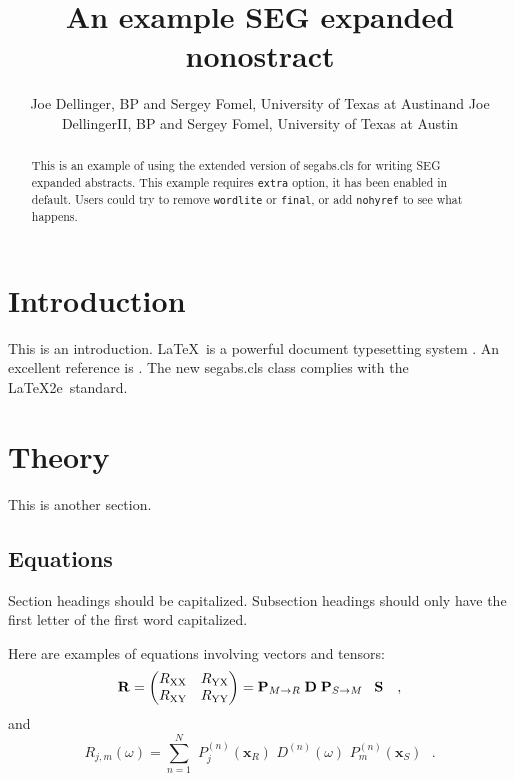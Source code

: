 \documentclass[wordlite,texlive,final]{segabs}
\newcommand{\rs}[1]{\mathstrut\mbox{\scriptsize\rm #1}}
\begin{document}
\title{An example SEG expanded nonostract}

\renewcommand{\thefootnote}{\fnsymbol{footnote}} 

\author{Joe Dellinger\footnotemark[1], BP 
  and Sergey Fomel, University of Texas at Austin\footnotemark[2] and Joe DellingerII\footnotemark[1], BP 
  and Sergey Fomel, University of Texas at Austin}


\maketitle

\begin{abstract}
  This is an example of using the extended version of \textsf{segabs.cls} for writing
  SEG expanded abstracts. This example requires \texttt{extra} option, it has been enabled in default. Users could try to remove \texttt{wordlite} or \texttt{final}, or add \texttt{nohyref} to see what happens.
\end{abstract}

\section{Introduction}

This is an introduction. \LaTeX\ is a powerful document typesetting
system \cite[]{lamport}. An excellent reference is \cite[]{kopka}. The
new \textsf{segabs.cls} class complies with the \LaTeX2e\ standard.

\section*{Theory}

This is another section. 

\subsection{Equations}

Section headings should be capitalized. Subsection headings should
only have the first letter of the first word capitalized.

Here are examples of equations involving vectors and tensors:
\begin{equation}
\tensor{R} = 
\begin{pmatrix}
  R_{\rs{XX}} & R_{\rs{YX}} \cr R_{\rs{XY}} & R_{\rs{YY}}
\end{pmatrix}
=
\tensor{P}_{M\rightarrow R} \; \tensor{D} \; \tensor{P}_{S\rightarrow M}
\;\;\; \tensor{S} \ \ \  ,
\label{SVD}
\end{equation}
and
\begin{equation}
R_{j,m}(\omega) =
\sum_{n=1}^{N} \, \,
P_{j}^{(n)}(\mathbf{x}_R) \, \,
D^{(n)}(\omega) \, \,
P_{m}^{(n)}(\mathbf{x}_S) \ \ \ .
\label{SVDray}
\end{equation}
\end{document}
